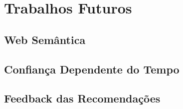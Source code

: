 \chapter{Trabalhos Futuros} %
\label{cha:trabalhos_futuros}

\section{Web Semântica} %
\label{sec:web_semantica}


\section{Confiança Dependente do Tempo} %
\label{sec:confianca_dependente_do_tempo}


\section{Feedback das Recomendações} %
\label{sec:feedback_das_recomendacoes}

